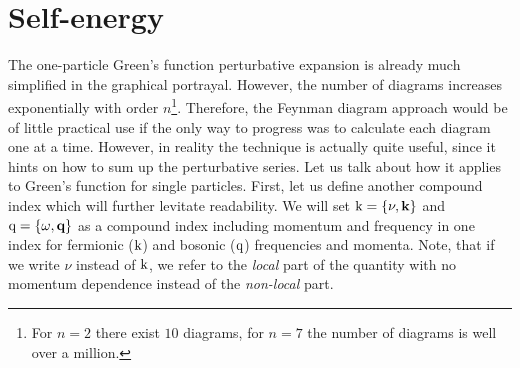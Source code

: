 \documentclass[\main/main.tex]{subfiles}
\begin{document}
\section{Self-energy}

The one-particle Green's function perturbative expansion is already much simplified in the graphical portrayal. However, the number of diagrams increases exponentially with order $n$\footnote{For $n=2$ there exist $10$ diagrams, for $n=7$ the number of diagrams is well over a million.}. Therefore, the Feynman diagram approach would be of little practical use if the only way to progress was to calculate each diagram one at a time. However, in reality the technique is actually quite useful, since it hints on how to sum up the perturbative series. Let us talk about how it applies to Green's function for single particles. First, let us define another compound index which will further levitate readability. We will set $\text{k}=\{\nu,\textbf{k}\}$ and $\text{q}=\{\omega, \textbf{q}\}$ as a compound index including momentum and frequency in one index for fermionic ($\text{k}$) and bosonic ($\text{q}$) frequencies and momenta. Note, that if we write $\nu$ instead of $\text{k}$, we refer to the \textit{local} part of the quantity with no momentum dependence instead of the \textit{non-local} part.
\end{document}
